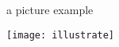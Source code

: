 a picture example
\begin{center}
    \texttt{[image: illustrate]}
\end{center}\cite{pmlr-v54-mcmahan17a}
